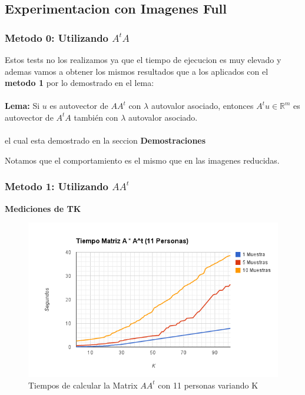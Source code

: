 \subsection{Experimentacion con Imagenes Full}

\subsubsection{Metodo 0: Utilizando $A^tA$}

Estos tests no los realizamos ya que el tiempo de ejecucion es muy elevado y ademas vamos  a obtener los mismos resultados que a los aplicados con el \textbf{metodo 1} por lo demostrado en el lema:
\\
\\
\textbf{Lema:} Si $u$ es autovector de $A A^t$ con $\lambda$ autovalor asociado, entonces $A^t u \in
\mathbb{R}^m$ es autovector de $A^t A$ también con $\lambda$ autovalor asociado.
\\
\\
 el cual esta demostrado en la seccion \textbf{Demostraciones}
 
Notamos que el comportamiento es el mismo que en las imagenes reducidas.


\subsubsection{Metodo 1: Utilizando $AA^t$}

\textbf{Mediciones de TK}

\begin{figure}[H]
\includegraphics[width=1\textwidth]{img/imagef1.png}
     \caption{Tiempos de calcular la Matrix $AA^t$ con 11 personas variando K}
\end{figure}

